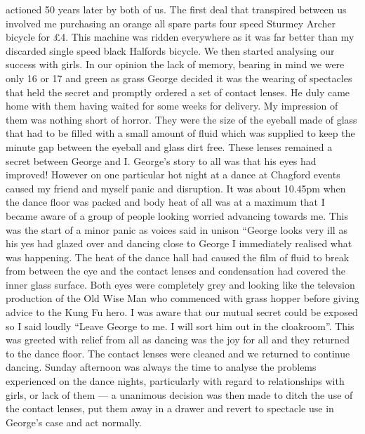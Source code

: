 actioned 50 years later by both of us. The first deal that transpired between
us involved me purchasing an orange all spare parts four speed Sturmey Archer
bicycle for £4. This machine was ridden everywhere as it was far better than my
discarded single speed black Halfords bicycle. We then started analysing our
success with girls. In our opinion the lack of memory, bearing in mind we were
only 16 or 17 and green as grass George decided it was the wearing of
spectacles that held the secret and promptly ordered a set of contact lenses.
He duly came home with them having waited for some weeks for delivery. My
impression of them was nothing short of horror. They were the size of the
eyeball made of glass that had to be filled with a small amount of fluid which
was supplied to keep the minute gap between the eyeball and glass dirt free.
These lenses remained a secret between George and I. George's story to all was
that his eyes had improved! However on one particular hot night at a dance at
Chagford events caused my friend and myself panic and disruption. It was about
10.45pm when the dance floor was packed and body heat of all was at a maximum
that I became aware of a group of people looking worried advancing towards me.
This was the start of a minor panic as voices said in unison ``George looks
very ill as his yes had glazed over and dancing close to George I immediately
realised what was happening. The heat of the dance hall had caused the film of
fluid to break from between the eye and the contact lenses and condensation had
covered the inner glass surface. Both eyes were completely grey and looking
like the televsion production of the Old Wise Man who commenced with grass
hopper before giving advice to the Kung Fu hero. I was aware that our mutual
secret could be exposed so I said loudly ``Leave George to me. I will sort him
out in the cloakroom''. This was greeted with relief from all as dancing was
the joy for all and they returned to the dance floor. The contact lenses were
cleaned and we returned to continue dancing. Sunday afternoon was always the
time to analyse the problems experienced on the dance nights, particularly with
regard to relationships with girls, or lack of them --- a unanimous decision
was then made to ditch the use of the contact lenses, put them away in a drawer
and revert to spectacle use in George's case and act normally.

